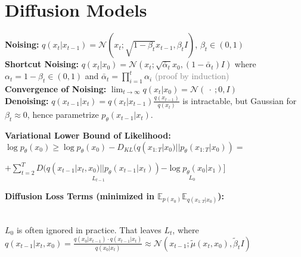 \section*{Diffusion Models}
\textbf{Noising:} $q(x_t | x_{t-1}) = \mathcal{N}(x_t ; \sqrt{1-\beta_t} x_{t-1}, \beta_t I)$, $\beta_t \in (0,1)$\\%
\textbf{Shortcut Noising:} $q(x_t | x_0) = \mathcal{N}(x_t ; \sqrt{\bar \alpha_t} x_0, (1-\bar \alpha_t) I)$ where $\alpha_t = 1-\beta_t \in (0,1)$ and $\bar \alpha_t = \prod_{i=1}^t \alpha_i$ \textcolor{gray}{(proof by induction)}\\
\textbf{Convergence of Noising:} $\lim_{t\to\infty} q(x_t | x_0) = \mathcal{N}(\ \cdot\ ;0, I)$\\

\textbf{Denoising:} $q(x_{t-1} | x_t) = q(x_t | x_{t-1})\frac{q(x_{t-1})}{q(x_t)}$ is intractable, but Gaussian for $\beta_t \approx 0$, hence parametrize $p_\theta(x_{t-1} | x_t)$.

\textbf{Variational Lower Bound of Likelihood:}\\
$\log p_\theta (x_0) \geq \log p_\theta (x_0) - D_{KL}(q(x_{1:T}|x_0)|| p_\theta(x_{1:T} | x_0)) \!=\! $

\resizebox{\linewidth}{!}{$\text{-} \mathbb{E}_{q(x_{1:T}|x_0)} [\log \frac{q(x_{1:T}|x_0)}{p_\theta(x_{0:T})}] \!=\! \text{-} \mathbb{E}_{q(x_{1:T}|x_0)}[\underset{L_T}{D(q(x_T | x_0) || p_\theta(x_T))}$}

\hfill $+\sum_{t=2}^T \underset{L_{t-1}}{D(q(x_{t-1} | x_t, x_0) || p_\theta(x_{t-1} | x_t))} \underset{L_0}{- \log p_\theta(x_0 | x_1)} ]$

\textbf{Diffusion Loss Terms (minimized in $\mathbb{E}_{p(x_0)}\mathbb{E}_{q(x_{1:T}|x_0)}$):}

\\
$L_0$ is often ignored in practice. That leaves $L_t$, where\\

$q(x_{t-1}|x_t, x_0) = \frac{q(x_0 | x_{t-1}) \cdot q(x_{t-1} |x_t)}{q(x_0 | x_t)} \approx \mathcal{N}(x_{t-1}; \tilde \mu(x_t, x_0), \tilde \beta_t I)$ 

